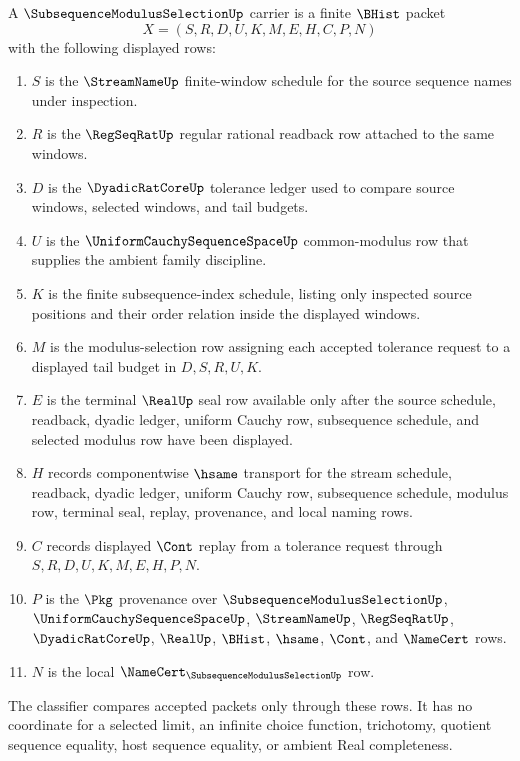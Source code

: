 \begin{definition}
\label{def:subsequence-modulus-selection-carrier}
A $\SubsequenceModulusSelectionUp$ carrier is a finite $\BHist$ packet
$$
X=(S,R,D,U,K,M,E,H,C,P,N)
$$
with the following displayed rows:
\begin{enumerate}
\item $S$ is the $\StreamNameUp$ finite-window schedule for the source sequence names under inspection.
\item $R$ is the $\RegSeqRatUp$ regular rational readback row attached to the same windows.
\item $D$ is the $\DyadicRatCoreUp$ tolerance ledger used to compare source windows, selected windows, and tail budgets.
\item $U$ is the $\UniformCauchySequenceSpaceUp$ common-modulus row that supplies the ambient family discipline.
\item $K$ is the finite subsequence-index schedule, listing only inspected source positions and their order relation inside the displayed windows.
\item $M$ is the modulus-selection row assigning each accepted tolerance request to a displayed tail budget in $D,S,R,U,K$.
\item $E$ is the terminal $\RealUp$ seal row available only after the source schedule, readback, dyadic ledger, uniform Cauchy row, subsequence schedule, and selected modulus row have been displayed.
\item $H$ records componentwise $\hsame$ transport for the stream schedule, readback, dyadic ledger, uniform Cauchy row, subsequence schedule, modulus row, terminal seal, replay, provenance, and local naming rows.
\item $C$ records displayed $\Cont$ replay from a tolerance request through $S,R,D,U,K,M,E,H,P,N$.
\item $P$ is the $\Pkg$ provenance over $\SubsequenceModulusSelectionUp$, $\UniformCauchySequenceSpaceUp$, $\StreamNameUp$, $\RegSeqRatUp$, $\DyadicRatCoreUp$, $\RealUp$, $\BHist$, $\hsame$, $\Cont$, and $\NameCert$ rows.
\item $N$ is the local $\NameCert_{\SubsequenceModulusSelectionUp}$ row.
\end{enumerate}
The classifier compares accepted packets only through these rows. It has no coordinate for a selected limit, an infinite choice function, trichotomy, quotient sequence equality, host sequence equality, or ambient Real completeness.
\end{definition}

